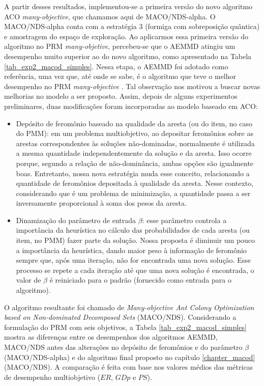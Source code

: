 A partir desses resultados, implementou-se a primeira versão do novo algoritmo ACO \textit{many-objective}, que chamamos aqui de MACO/NDS-alpha. O MACO/NDS-alpha conta com a estratégia 3 (formiga com sobreposição quântica) e amostragem do espaço de exploração. Ao aplicarmos essa primeira versão do algoritmo no PRM \textit{many-objetive}, percebeu-se que o AEMMD atingiu um desempenho muito superior ao do novo algoritmo, como apresentado na Tabela \ref{tab_exp2_macod_simples}. Nessa etapa, o AEMMD foi adotado como referência, uma vez que, até onde se sabe, é o algoritmo que teve o melhor desempenho no PRM \textit{many-objective} \cite{LafetaThesis}. Tal observação nos motivou a buscar novas melhorias no modelo a ser proposto. Assim, depois de alguns experimentos preliminares, duas modificações foram incorporadas ao modelo baseado em ACO:

\begin{itemize}
	\item Depósito de feromônio baseado na qualidade da aresta (ou do item, no caso do PMM): em um problema multiobjetivo, ao depositar feromônios sobre as arestas correspondentes às soluções não-dominadas, normalmente é utilizada a mesma quantidade independentemente da solução e da aresta. Isso ocorre porque, segundo a relação de não-dominância, ambas opções são igualmente boas. Entretanto, nossa nova estratégia muda esse conceito, relacionando a quantidade de feromônios depositada à qualidade da aresta. Nesse contexto, considerando que é um problema de minimização, a quantidade passa a ser inversamente proporcional à soma dos pesos da aresta.
	\item Dinamização do parâmetro de entrada $\beta$: esse parâmetro controla a importância da heurística no cálculo das probabilidades de cada aresta (ou item, no PMM) fazer parte da solução. Nossa proposta é diminuir um pouco a importância da heurística, dando maior peso à informação de feromônio sempre que, após uma iteração, não for encontrada uma nova solução. Esse processo se repete a cada iteração até que uma nova solução é encontrada, o valor de $\beta$ é reiniciado para o padrão (fornecido como entrada para o algoritmo).
\end{itemize}

O algoritmo resultante foi chamado de \textit{Many-objective Ant Colony Optimization based on Non-dominated Decomposed Sets} (MACO/NDS). Considerando a formulação do PRM com seis objetivos, a Tabela \ref{tab_exp2_macod_simples} mostra as diferenças entre os desempenhos dos algoritmos AEMMD, MACO/NDS antes das alterações no depósito de feromônios e do parâmetro $\beta$ (MACO/NDS-alpha) e do algoritmo final proposto no capítulo \ref{chapter_macod} (MACO/NDS). A comparação é feita com base nos valores médios das métricas de desempenho multiobjetivo ($ER$, $GDp$ e $PS$).

